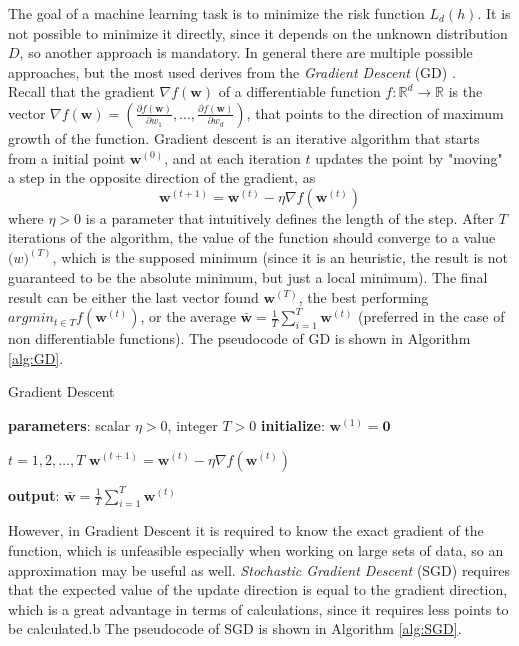 The goal of a machine learning task is to minimize the risk function $L_d(h)$. It is not possible to minimize it directly, since it depends on the unknown distribution $D$, so another approach is mandatory. In general there are multiple possible approaches, but the most used derives from the \textit{Gradient Descent} (GD) \cite{article-gs-sgd}. \\
Recall that the gradient $\nabla f(\mathbf{w})$ of a differentiable function $f: \mathbb{R}^d \rightarrow \mathbb{R}$ is the vector  $\nabla f(\mathbf{w}) = \left( \frac{\partial f(\mathbf{w})}{\partial w_1}, \dots, \frac{\partial f(\mathbf{w})}{\partial w_d} \right)$, that points to the direction of maximum growth of the function. Gradient descent is an iterative algorithm that starts from a initial point $\mathbf{w}^{(0)}$, and at each iteration $t$ updates the point by "moving" a step in the opposite direction of the gradient, as
\[ \mathbf{w}^{(t+1)} = \mathbf{w}^{(t)} - \eta \nabla f(\mathbf{w}^{(t)}) \]
where $\eta > 0$ is a parameter that intuitively defines the length of the step. After $T$ iterations of the algorithm, the value of the function should converge to a value $\mathbf(w)^{(T)}$, which is the supposed minimum (since it is an heuristic, the result is not guaranteed to be the absolute minimum, but just a local minimum). The final result can be either the last vector found $\mathbf{w}^{(T)}$, the best performing $argmin_{t \in T} f(\mathbf{w}^{(t)})$, or the average $\mathbf{\bar{w}} = \frac{1}{T} \sum_{i=1}^{T} \mathbf{w}^{(t)}$ (preferred in the case of non differentiable functions). The pseudocode of GD is shown in Algorithm \ref{alg:GD}.

\begin{algorithm}
\caption{Gradient Descent}\label{alg:GD}
\begin{algorithmic}[1]
	\State \textbf{parameters}: scalar $\eta > 0$, integer $T>0$
	\State \textbf{initialize}: $\mathbf{w}^{(1)} = \mathbf{0}$
	
	\For $t = 1, 2, \dots , T$
	\State $\mathbf{w}^{(t+1)} = \mathbf{w}^{(t)} - \eta \nabla f(\mathbf{w}^{(t)})$
	\EndFor
	
	\State \textbf{output}: $\mathbf{\bar{w}} = \frac{1}{T} \sum_{i=1}^{T} \mathbf{w}^{(t)}$
\end{algorithmic}
\end{algorithm}


However, in Gradient Descent it is required to know the exact gradient of the function, which is unfeasible especially when working on large sets of data, so an approximation may be useful as well. \textit{Stochastic Gradient Descent} (SGD) requires that the expected value of the update direction is equal to the gradient direction, which is a great advantage in terms of calculations, since it requires less points to be calculated.b The pseudocode of SGD is shown in Algorithm \ref{alg:SGD}.

